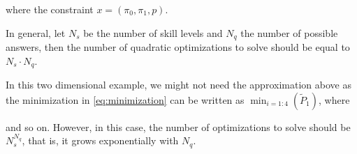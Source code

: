 \documentclass[runningheads]{llncs}
\begin{document}
	where the constraint $x = (\pi_0, \pi_1 ,p)$.
	
	In general, let $N_s$ be the number of skill levels and $N_q$ the number of possible 
	answers, then the number of quadratic optimizations to solve should be equal to 
	$N_s\cdot N_q$. 
	
	In this two dimensional example, we might not need the approximation above as the 
	minimization in \ref{eq:minimization} can be written as $\min_{i=1:4}(\tilde{P}_1)$, where
	
	and so on. However, in this case, the number of optimizations to solve should be 
	$N_s^{N_q}$, that is, it grows exponentially with  $N_q$. 
	
\end{document}
